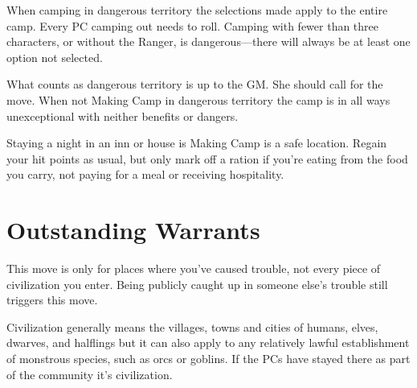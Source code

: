  

When camping in dangerous territory the selections made apply to the entire camp. Every PC camping out needs to roll. Camping with fewer than three characters, or without the Ranger, is dangerous—there will always be at least one option not selected.

 

What counts as dangerous territory is up to the GM. She should call for the move. When not Making Camp in dangerous territory the camp is in all ways unexceptional with neither benefits or dangers.

 

Staying a night in an inn or house is Making Camp is a safe location. Regain your hit points as usual, but only mark off a ration if you're eating from the food you carry, not paying for a meal or receiving hospitality.

 
\section{Outstanding Warrants}   
 

This move is only for places where you've caused trouble, not every piece of civilization you enter. Being publicly caught up in someone else's trouble still triggers this move.

 

Civilization generally means the villages, towns and cities of humans, elves, dwarves, and halflings but it can also apply to any relatively lawful establishment of monstrous species, such as orcs or goblins. If the PCs have stayed there as part of the community it's civilization.



 




